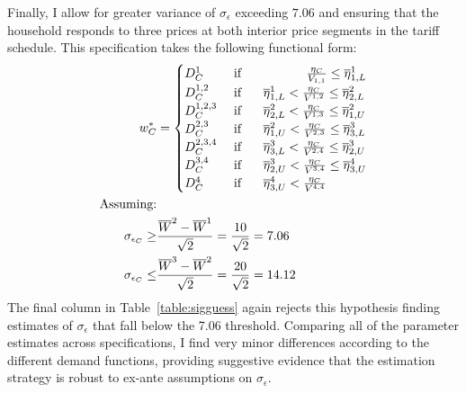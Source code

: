 \documentclass[12pt]{article}
\begin{document}
\begin{appendices}
Finally, I allow for greater variance of $\sigma_{\epsilon}$ exceeding $7.06$ and ensuring that the household responds to three prices at both interior price segments in the tariff schedule.  This specification takes the following functional form:
\begin{align}\label{equation:demandalt2}
\begin{split}
w^{*}_C &=
\begin{cases}
D^{1}_C   & \text{ if } \hspace{1.7cm}   \frac{ \eta_C }{ V_{1,1} }  \leq \overline{\eta}^{1}_{1,L}  \\
D^{1,2}_C   & \text{ if } \hspace{.5cm} \overline{\eta}^{1}_{1,L} <    \frac{ \eta_C }{ V^{1,2} }    \leq \overline{\eta}^{2}_{2,L}  \\
D^{1,2,3}_C   & \text{ if } \hspace{.5cm} \overline{\eta}^{2}_{2,L} <    \frac{ \eta_C }{ V^{1,3} }    \leq \overline{\eta}^{2}_{1,U}  \\
D^{2,3}_C   & \text{ if } \hspace{.5cm} \overline{\eta}^{2}_{1,U} <    \frac{ \eta_C }{ V^{2,3} }    \leq \overline{\eta}^{3}_{3,L}  \\ 
D^{2,3,4}_C   & \text{ if } \hspace{.5cm} \overline{\eta}^{3}_{3,L} <    \frac{ \eta_C }{ V^{2,4} }    \leq \overline{\eta}^{3}_{2,U}  \\ 
D^{3,4}_C   & \text{ if } \hspace{.5cm} \overline{\eta}^{3}_{2,U} <    \frac{ \eta_C }{ V^{3,4} }    \leq \overline{\eta}^{4}_{3,U}  \\ 
D^{4}_C   & \text{ if } \hspace{.5cm} \overline{\eta}^{4}_{3,U} <    \frac{ \eta_C }{ V^{4,4} }  
\end{cases}\\
\text{Assuming:}\\
 \sigma_{\epsilon_C} \geq &\frac{  \overline{W}^{2} - \overline{W}^{1} }{ \sqrt{2} } = \frac{ 10 }{  \sqrt{2} } = 7.06 \\
 \sigma_{\epsilon_C} \leq &\frac{  \overline{W}^{3} - \overline{W}^{2} }{ \sqrt{2} } = \frac{ 20 }{  \sqrt{2} } = 14.12
\end{split}
\end{align}
The final column in Table~\ref{table:sigguess} again rejects this hypothesis finding estimates of $\sigma_{\epsilon}$ that fall below the 7.06 threshold.  Comparing all of the parameter estimates across specifications, I find very minor differences according to the different demand functions, providing suggestive evidence that the estimation strategy is robust to ex-ante assumptions on $\sigma_{\epsilon}$.



\end{appendices}
\end{document}
